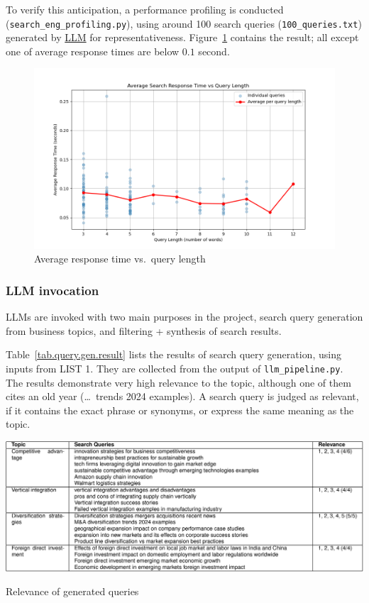 \documentclass[final-report]{report-template}
\newcommand\ttb{\discretionary{}{}{}}
\begin{document}
To verify this anticipation, a performance profiling is conducted
(\texttt{search\_\ttb eng\_\ttb profiling.py}), using around 100
search queries (\texttt{100\_\ttb queries.txt}) generated by
\href{https://chatgpt.com/share/689a013a-5964-8011-af0d-68a169ce8290}{LLM} for
representativeness. Figure~\ref{fig.response.time} contains the result; all
except one of average response times are below $0.1$ second.
\begin{figure}[hbtp!]
	\centering
	\includegraphics[height=.25\textheight]{res/avg_time_vs_query_length.png}
	\caption{Average response time vs.\ query length}
	\label{fig.response.time}
\end{figure}

\subsubsection{LLM invocation}
LLMs are invoked with two main purposes in the project, search query generation
from business topics, and filtering + synthesis of search results.

Table~\ref{tab.query.gen.result} lists the results of search query generation,
using inputs from LIST 1. They are collected from the output of
\texttt{llm\_\ttb pipeline.py}. The results demonstrate very high relevance to
the topic, although one of them cites an old year (\dots\ trends 2024
examples). A search query is judged as relevant, if it contains the exact
phrase or synonyms, or express the same meaning as the topic.
\begin{table}[hbtp!]
\centering
\includegraphics[width=.85\textwidth]{res/table_search_queries.png}
\caption{Relevance of generated queries}
\label{tab.query.gen.result}
\end{table}
\end{document}
